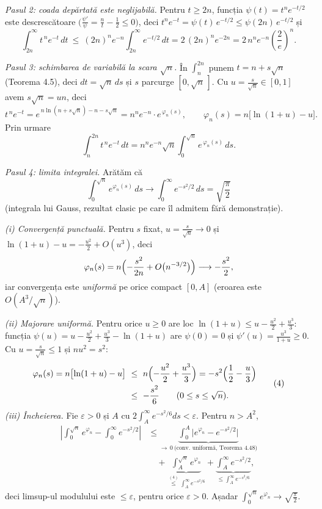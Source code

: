 \emph{Pasul 2: coada depărtată este neglijabilă.} Pentru $t\ge2n$, funcția $\psi(t)=t^{n}e^{-t/2}$ este descrescătoare $\bigl(\frac{\psi'}{\psi}=\frac nt-\frac12\le0\bigr)$, deci $t^{n}e^{-t}=\psi(t)\,e^{-t/2}\le\psi(2n)\,e^{-t/2}$ și
\[ \int_{2n}^{\infty}t^{\,n}e^{-t}\,dt\ \le\ (2n)^{n}e^{-n}\int_{2n}^{\infty}e^{-t/2}\,dt=2\,(2n)^{n}e^{-2n}=2\,n^{n}e^{-n}\left(\frac2e\right)^{\!n} . \tag{2} \]

\emph{Pasul 3: schimbarea de variabilă la scara $\sqrt n$.} În $\int_n^{2n}$ punem $t=n+s\sqrt n$ (Teorema 4.5), deci $dt=\sqrt n\,ds$ și $s$ parcurge $[0,\sqrt n\,]$. Cu $u=\frac{s}{\sqrt n}\in[0,1]$ avem $s\sqrt n=un$, deci
\[ t^{\,n}e^{-t}=e^{\,n\ln(n+s\sqrt n)-n-s\sqrt n}=n^{n}e^{-n}\cdot e^{\,\varphi_n(s)},\qquad \varphi_n(s)=n\bigl[\ln(1+u)-u\bigr] . \]
Prin urmare
\[ \int_n^{2n}t^{\,n}e^{-t}\,dt=n^{n}e^{-n}\sqrt n\int_0^{\sqrt n}e^{\,\varphi_n(s)}\,ds . \tag{3} \]

\emph{Pasul 4: limita integralei.} Arătăm că \[ \int_0^{\sqrt n}e^{\varphi_n(s)}\,ds\to\int_0^{\infty}e^{-s^{2}/2}\,ds=\sqrt{\frac\pi2} \] (integrala lui Gauss, rezultat clasic pe care îl admitem fără demonstrație).

\emph{(i) Convergență punctuală.} Pentru $s$ fixat, $u=\frac s{\sqrt n}\to0$ și $\ln(1+u)-u=-\frac{u^{2}}{2}+O(u^{3})$, deci
\[ \varphi_n(s)=n\Bigl(-\frac{s^{2}}{2n}+O\bigl(n^{-3/2}\bigr)\Bigr)\longrightarrow-\frac{s^{2}}{2} , \]
iar convergența este \emph{uniformă} pe orice compact $[0,A]$ (eroarea este $O(A^{3}/\sqrt n)$).

\emph{(ii) Majorare uniformă.} Pentru orice $u\ge0$ are loc $\ln(1+u)\le u-\frac{u^{2}}{2}+\frac{u^{3}}{3}$: funcția $\psi(u)=u-\frac{u^2}2+\frac{u^3}3-\ln(1+u)$ are $\psi(0)=0$ și $\psi'(u)=\frac{u^{3}}{1+u}\ge0$. Cu $u=\frac s{\sqrt n}\le1$ și $nu^{2}=s^{2}$:
\[ \begin{aligned} \varphi_n(s)=n\bigl[\ln(1+u)-u\bigr]&\ \le\ n\Bigl(-\frac{u^{2}}{2}+\frac{u^{3}}{3}\Bigr)=-s^{2}\Bigl(\frac12-\frac u3\Bigr)\\ &\ \le\ -\frac{s^{2}}{6}\qquad(0\le s\le\sqrt n). \end{aligned} \tag{4} \]
\emph{(iii) Încheierea.} Fie $\varepsilon>0$ și $A$ cu $2\int_A^{\infty}e^{-s^{2}/6}ds<\varepsilon$. Pentru $n>A^{2}$,
\[ \begin{aligned} \left|\int_0^{\sqrt n}e^{\varphi_n}-\int_0^{\infty}e^{-s^{2}/2}\right|&\le\underbrace{\int_0^{A}\bigl|e^{\varphi_n}-e^{-s^{2}/2}\bigr|}_{\to\,0\ \text{(conv. uniformă, Teorema 4.48)}}\\ &\quad+\underbrace{\int_A^{\sqrt n}e^{\varphi_n}}_{\overset{(4)}{\le}\int_A^{\infty}e^{-s^{2}/6}}+\underbrace{\int_A^{\infty}e^{-s^{2}/2}}_{\le\int_A^{\infty}e^{-s^{2}/6}} , \end{aligned} \]
deci limsup-ul modulului este $\le\varepsilon$, pentru orice $\varepsilon>0$. Așadar $\int_0^{\sqrt n}e^{\varphi_n}\to\sqrt{\frac\pi2}$.

